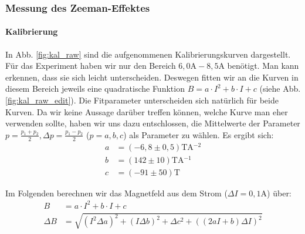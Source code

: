 \subsubsection{Messung des Zeeman-Effektes}
\paragraph{Kalibrierung}
In Abb. \ref{fig:kal_raw} sind die aufgenommenen Kalibrierungskurven dargestellt. Für das Experiment haben wir nur den Bereich $6,0\si{\ampere} - 8,5\si{\ampere}$ benötigt. Man kann erkennen, dass sie sich leicht unterscheiden. Deswegen fitten wir an die Kurven in diesem Bereich jeweils eine quadratische Funktion $B = a\cdot I^2 + b \cdot I + c$ (siehe Abb. \ref{fig:kal_raw_edit}). Die Fitparameter unterscheiden sich natürlich für beide Kurven. Da wir keine Aussage darüber treffen können, welche Kurve man eher verwenden sollte, haben wir uns dazu entschlossen, die Mittelwerte der Parameter $p = \frac{p_1+p_2}{2} , \Delta p = \frac{p_1-p_2}{2}$ ($p = a,b,c$) als Parameter zu wählen. Es ergibt sich: 
\begin{align*}
a &= \si{(-6,8 \pm 0,5)\tesla\ampere^{-2}}\\
b &= \si{(142 \pm 10) \tesla\ampere^{-1}}\\
c &= \si{(-91 \pm 50)\tesla}
\end{align*}

Im Folgenden berechnen wir das Magnetfeld aus dem Strom ($\Delta I = \si{0,1 \ampere}$) über:
\begin{align*}
B &= a\cdot I^2 + b \cdot I + c\\
\Delta B &= \sqrt{(I^2\Delta a)^2 + (I \Delta b)^2 + \Delta c^2 + ((2aI+b)\Delta I)^2}
\end{align*}

